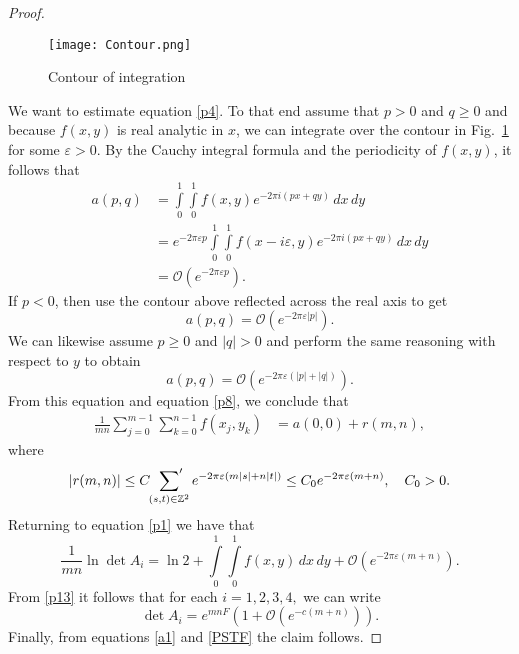 \documentclass[12pt,reqno]{amsart}
\numberwithin{equation}{section}
\newcommand{\Z}{{\mathbb Z}}
\begin{document}
\begin{proof}
\begin{figure}[h]
\centering
\texttt{[image: Contour.png]}
\caption{Contour of integration}
\label{F6}
\end{figure}
We want to estimate equation \eqref{p4}. To that end assume that $p>0$ and $q\ge 0$ and because $f(x,y)$ is real analytic in $x$, we can integrate over the contour in Fig.\ \ref{F6} for some $\varepsilon>0$. By the Cauchy integral formula and the periodicity of $f(x,y)$, it follows that
\begin{equation}\label{p9}
\begin{aligned}
a(p,q)&=\int\limits_0^1\int\limits_0^1f(x,y)e^{-2\pi i (px+qy)}\,dx\,dy\\
&=e^{-2\pi\varepsilon p}\int\limits_0^1\int\limits_0^1f(x-i\varepsilon,y)e^{-2\pi i (px+qy)}\,dx\,dy\\
&=\mathcal{O}\left(e^{-2\pi \varepsilon p}\right).
\end{aligned}
\end{equation}
If $p<0$, then use the contour above reflected across the real axis to get
\begin{equation}\label{p10}
a(p,q)=\mathcal{O}\left(e^{-2\pi  \varepsilon |p|}\right).
\end{equation}
We can likewise assume $p\ge 0$ and $|q|>0$ and perform the same reasoning with respect to $y$ to obtain
\begin{equation}\label{p11}
a(p,q)=\mathcal{O}\left(e^{-2\pi \varepsilon(|p|+|q|)}\right).
\end{equation}
From this equation and equation \eqref{p8}, we conclude that 
\begin{equation}\label{p12}
\begin{aligned}
\frac{1}{mn}\sum_{j=0}^{m-1}\sum_{k=0}^{n-1}
f(x_j,y_k)&=a(0,0)+r(m,n),
\end{aligned}
\end{equation}
where 
\begin{equation}\label{p14}
\begin{aligned}
|r(m,n)|\le C\sideset{}{'}\sum_{(s,t)\in\Z^2}e^{-2\pi \varepsilon (m|s|+n|t|)}\le C_0e^{-2\pi \varepsilon(m+n)},\quad C_0>0.
\end{aligned}
\end{equation}
Returning to equation \eqref{p1} we have that
\begin{equation}\label{p13}
\frac{1}{mn}\ln\det A_i=\ln 2+\int\limits_0^1\int\limits_0^1 f(x,y)\,dx\,dy+\mathcal{O}\left(e^{-2\pi\varepsilon(m+n)}\right).
\end{equation}
From \eqref{p13} it follows that for each $i=1,2,3,4,$ we can write
\begin{equation}\label{15}
\det A_i=e^{mnF}\left(1+\mathcal{O}\left(e^{-c(m+n)}\right)\right).
\end{equation}
Finally, from equations \eqref{a1} and \eqref{PSTF} the claim follows.
\end{proof}
\end{document}
